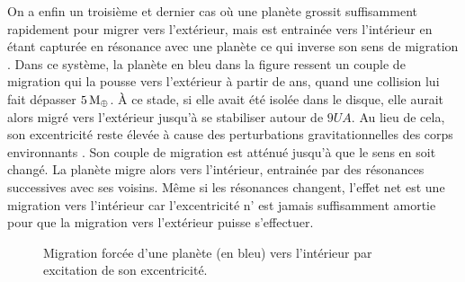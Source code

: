 \bigskip

On a enfin un troisième et dernier cas où une planète grossit suffisamment rapidement pour migrer vers l'extérieur, mais est entrainée vers l'intérieur en étant capturée en résonance avec une planète ce qui inverse son sens de migration . Dans ce système, la planète en bleu dans la figure ressent un couple de migration qui la pousse vers l'extérieur à partir de  ans, quand une collision lui fait dépasser $5\mathrm{\thinspace M_\oplus}$. À ce stade, si elle avait été isolée dans le disque, elle aurait alors migré vers l'extérieur jusqu'à se stabiliser autour de $9\unit{UA}$. Au lieu de cela, son excentricité reste élevée à cause des perturbations gravitationnelles des corps environnants . Son couple de migration est atténué jusqu'à que le sens en soit changé. La planète migre alors vers l'intérieur, entrainée par des résonances successives avec ses voisins. Même si les résonances changent, l'effet net est une migration vers l'intérieur car l'excentricité n'
est jamais suffisamment amortie pour que la migration vers l'extérieur puisse s'effectuer.

\begin{figure}[htbp]
\centering
{}\hfill
{}
\caption{Migration forcée d'une planète (en bleu) vers l'intérieur par excitation de son excentricité.}\label{fig:HSE_forced_in}
\end{figure}%


